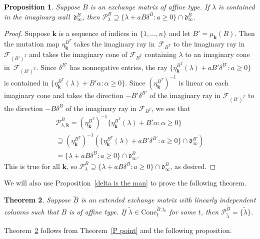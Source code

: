 \documentclass[10pt]{article}
\newtheorem{proposition}{Proposition}[section]
\newtheorem{theorem}[proposition]{Theorem}
\theoremstyle{definition}
\theoremstyle{remark}
\numberwithin{equation}{section}
\newcommand{\set}[1]{{\lbrace #1 \rbrace}}
\newcommand{\F}{{\mathcal F}}
\newcommand{\0}{{\mathbf{0}}}
\newcommand{\Cone}{\mathrm{Cone}}
\newcommand{\kk}{{\boldsymbol{k}}}
\newcommand{\tB}{{\widetilde{B}}}
\renewcommand{\P}{\mathcal{P}}
\renewcommand{\d}{{\mathfrak d}}
\begin{document}
\begin{proposition}\label{affine main partial}
Suppose $B$ is an exchange matrix of affine type.
If $\lambda$ is contained in the imaginary wall~$\d^B_\infty$, then $\P^B_\lambda\supseteq\set{\lambda+aB\delta^B:a\ge0}\cap\d^B_\infty$.  %
\end{proposition}
\begin{proof}
Suppose $\kk$ is a sequence of indices in $\set{1,\ldots,n}$ and let $B'=\mu_\kk(B)$.
Then the mutation map $\eta^{B^T}_\kk$ takes the imaginary ray in~$\F_{B^T}$ to the imaginary ray in~$\F_{(B')^T}$ and takes the imaginary cone of $\F_{B^T}$ containing $\lambda$ to an imaginary cone in~$\F_{(B')^T}$.
Since $\delta^{B'}$ has nonnegative entries, the ray $\set{\eta^{B^T}_\kk(\lambda)+aB'\delta^{B'}:a\ge0}$ is contained in $\set{\eta^{B^T}_\kk(\lambda)+B'\alpha:\alpha\ge0}$.
Since $(\eta_\kk^{B^T})^{-1}$ is linear on each imaginary cone and takes the direction $-B'\delta^{B'}$ of the imaginary ray in $\F_{(B')^T}$ to the direction $-B\delta^B$ of the imaginary ray in $\F_{B^T}$, we see that 
\begin{multline*}
\P^B_{\lambda,\kk}=(\eta_\kk^{B^T})^{-1}\set{\eta^{B^T}_\kk(\lambda)+B'\alpha:\alpha\ge0}\\
\supseteq(\eta_\kk^{B^T})^{-1}\left(\set{\eta^{B^T}_\kk(\lambda)+aB'\delta^{B'}:a\ge0}\cap\d^{B'}_\infty\right)\\
=\set{\lambda+aB\delta^B:a\ge0}\cap\d^B_\infty. 
\end{multline*}
This is true for all $\kk$, so $\P^B_\lambda\supseteq\set{\lambda+aB\delta^B:a\ge0}\cap\d^B_\infty$, as desired.
\end{proof}

We will also use Proposition~\ref{delta is the man} to prove the following theorem.

\begin{theorem}\label{affine P point indep}
Suppose $\tB$ is an extended exchange matrix with linearly independent columns such that $B$ is of affine type.
  If $\tilde\lambda\in\Cone^{\tB;t_0}_t$ for some $t$, then $\P^\tB_{\tilde\lambda}=\set{\tilde\lambda}$.
\end{theorem}

Theorem~\ref{affine P point indep} follows from Theorem~\ref{P point} and the following proposition.
\end{document}
